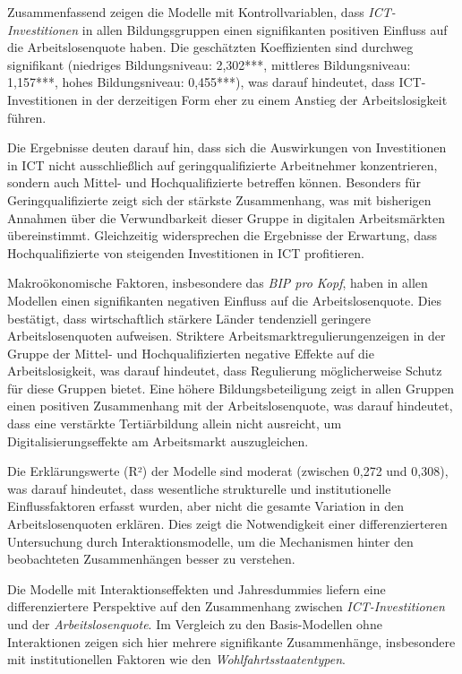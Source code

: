 Zusammenfassend zeigen die Modelle mit Kontrollvariablen, dass \textit{\ac{ICT}-Investitionen}
in allen Bildungsgruppen einen signifikanten positiven Einfluss auf die Arbeitslosenquote haben.
Die geschätzten Koeffizienten sind durchweg signifikant (niedriges Bildungsniveau: 2,302***,
mittleres Bildungsniveau: 1,157***, hohes Bildungsniveau: 0,455***), was darauf hindeutet, dass
\ac{ICT}-Investitionen in der derzeitigen Form eher zu einem Anstieg der Arbeitslosigkeit führen.

Die Ergebnisse deuten darauf hin, dass sich die Auswirkungen von Investitionen in \ac{ICT} nicht
ausschließlich auf geringqualifizierte Arbeitnehmer konzentrieren, sondern auch Mittel- und
Hochqualifizierte betreffen können. Besonders für Geringqualifizierte zeigt sich der stärkste
Zusammenhang, was mit bisherigen Annahmen über die Verwundbarkeit dieser Gruppe in digitalen
Arbeitsmärkten übereinstimmt. Gleichzeitig widersprechen die Ergebnisse der Erwartung, dass
Hochqualifizierte von steigenden Investitionen in \ac{ICT} profitieren.

Makroökonomische Faktoren, insbesondere das \textit{\ac{BIP} pro Kopf}, haben in allen Modellen 
einen signifikanten negativen Einfluss auf die Arbeitslosenquote. Dies bestätigt, dass wirtschaftlich 
stärkere Länder tendenziell geringere Arbeitslosenquoten aufweisen. Striktere 
Arbeitsmarktregulierungenzeigen in der Gruppe der Mittel- und Hochqualifizierten negative Effekte auf 
die Arbeitslosigkeit, was darauf hindeutet, dass Regulierung möglicherweise Schutz für diese Gruppen 
bietet. Eine höhere Bildungsbeteiligung zeigt in allen Gruppen einen positiven Zusammenhang mit der 
Arbeitslosenquote, was darauf hindeutet, dass eine verstärkte Tertiärbildung allein nicht ausreicht, 
um Digitalisierungseffekte am Arbeitsmarkt auszugleichen.

Die Erklärungswerte (R²) der Modelle sind moderat (zwischen 0,272 und 0,308), was darauf
hindeutet, dass wesentliche strukturelle und institutionelle Einflussfaktoren erfasst wurden,
aber nicht die gesamte Variation in den Arbeitslosenquoten erklären. Dies zeigt die Notwendigkeit
einer differenzierteren Untersuchung durch Interaktionsmodelle, um die Mechanismen hinter den
beobachteten Zusammenhängen besser zu verstehen.



Die Modelle mit Interaktionseffekten und Jahresdummies liefern eine differenziertere Perspektive auf den 
Zusammenhang zwischen \textit{\ac{ICT}-Investitionen} und der \textit{Arbeitslosenquote}. Im Vergleich zu den 
Basis-Modellen ohne Interaktionen zeigen sich hier mehrere signifikante Zusammenhänge, insbesondere mit 
institutionellen Faktoren wie den \textit{Wohlfahrtsstaatentypen}.

